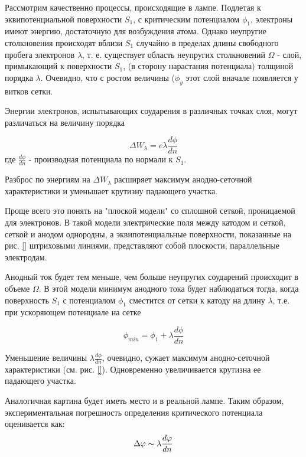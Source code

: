 Рассмотрим качественно процессы, происходящие в лампе. Подлетая к эквипотенциальной поверхности $S_1$, с критическим потенциалом $\phi_1$, электроны имеют энергию, достаточную для возбуждения атома. Однако неупругие столкновения происходят вблизи $S_1$ случайно в пределах длины свободного пробега электронов $\lambda$, т. е. существует область неупругих столкновений $\Omega$ - слой, примыкающий к поверхности $S_1$, (в сторону нарастания потенциала) толщиной порядка $\lambda$. Очевидно, что с ростом величины ($\phi_y$ этот слой вначале появляется у витков сетки.

Энергии электронов, испытывающих соударения в различных точках слоя, могут различаться на величину порядка

\begin{equation*}
	\Delta W_{\lambda} = e \lambda \frac{d\phi}{dn}
\end{equation*}
где $\displaystyle\frac{d\phi}{dn}$ - производная потенциала по нормали к $S_1$.

Разброс по энергиям на $\Delta W_\lambda$ расширяет максимум анодно-сеточной характеристики и уменьшает крутизну падающего участка.

Проще всего это понять на "плоской модели" со сплошной сеткой, проницаемой для электронов. В такой модели электрические поля между катодом и сеткой, сеткой и анодом однородны, а эквипотенциальные поверхности, показанные на рис. \ref{} штриховыми линиями, представляют собой плоскости, параллельные электродам.

Анодный ток будет тем меньше, чем больше неупругих соударений происходит в объеме $\Omega$. В этой модели минимум анодного тока будет наблюдаться тогда, когда поверхность $S_1$ с потенциалом $\phi_1$ сместится от сетки к катоду на длину $\lambda$, т.е. при ускоряющем потенциале на сетке

\begin{equation*}
	\phi_{min}=\phi_1+\lambda\frac{d\phi}{dn}
\end{equation*}

Уменьшение величины $\displaystyle\lambda\frac{d\phi}{dn}$, очевидно, сужает максимум анодно-сеточной характеристики (см. рис. \ref{}). Одновременно увеличивается крутизна ее падающего участка.

Аналогичная картина будет иметь место и в реальной лампе. Таким образом, экспериментальная погрешность определения критического потенциала оценивается как:
\begin{equation*}
	\Delta \phi \thicksim \lambda \frac{d\phi}{dn}
\end{equation*}

